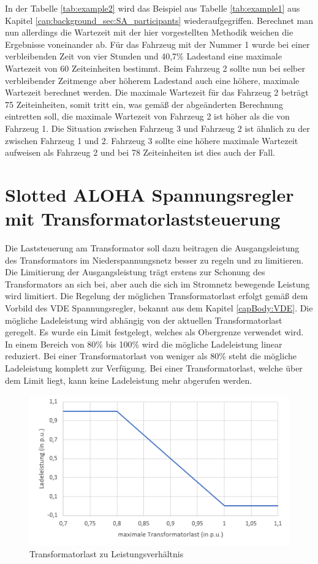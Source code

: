 In der Tabelle \ref{tab:example2} wird das Beispiel aus Tabelle \ref{tab:example1} aus Kapitel \ref{cap:background_sec:SA_participants} wiederaufgegriffen. Berechnet man nun allerdings die Wartezeit mit der hier vorgestellten Methodik weichen die Ergebnisse voneinander ab. Für das Fahrzeug mit der Nummer 1 wurde bei einer verbleibenden Zeit von vier Stunden und 40,7\% Ladestand eine maximale Wartezeit von 60 Zeiteinheiten bestimmt. Beim Fahrzeug 2 sollte nun bei selber verbleibender Zeitmenge aber höherem Ladestand auch eine höhere, maximale Wartezeit berechnet werden. Die maximale Wartezeit für das Fahrzeug 2 beträgt 75 Zeiteinheiten, somit tritt ein, was gemäß der abgeänderten Berechnung eintretten soll, die maximale Wartezeit von Fahrzeug 2 ist höher als die von Fahrzeug 1. Die Situation zwischen Fahrzeug 3 und Fahrzeug 2 ist ähnlich zu der zwischen Fahrzeug 1 und 2. Fahrzeug 3 sollte eine höhere maximale Wartezeit aufweisen als Fahrzeug 2 und bei 78 Zeiteinheiten ist dies auch der Fall.  

\section{Slotted ALOHA Spannungsregler mit Transformatorlaststeuerung}
Die Laststeuerung am Transformator soll dazu beitragen die Ausgangsleistung des Transformators im Niederspannungsnetz besser zu regeln und zu limitieren. Die Limitierung der Ausgangsleistung trägt erstens zur Schonung des Transformators an sich bei, aber auch die sich im Stromnetz bewegende Leistung wird limitiert. Die Regelung der möglichen Transformatorlast erfolgt gemäß dem Vorbild des VDE Spannungsregler, bekannt aus dem Kapitel \ref{capBody:VDE}. Die mögliche Ladeleistung wird abhängig von der aktuellen Transformatorlast geregelt. Es wurde ein Limit festgelegt, welches als Obergrenze verwendet wird. In einem Bereich von 80\% bis 100\% wird die mögliche Ladeleistung linear reduziert. Bei einer Transformatorlast von weniger als 80\% steht die mögliche Ladeleistung komplett zur Verfügung. Bei einer Transformatorlast, welche über dem Limit liegt, kann keine Ladeleistung mehr abgerufen werden.  \\
\begin{figure}[htb]
	\includegraphics[width = \linewidth]{img/TrafoGraph1.png}
	\caption{Transformatorlast zu Leistungsverhältnis}
	\label{SATrafo:Graph}
\end{figure}

